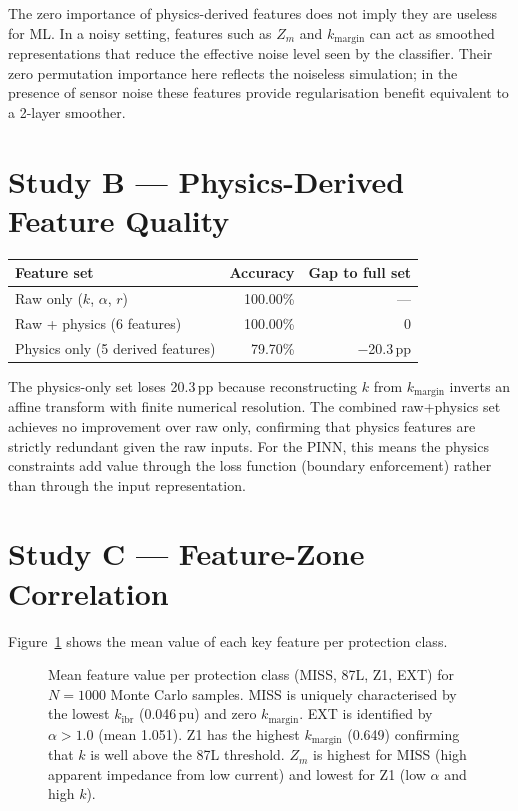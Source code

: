 \documentclass[11pt,a4paper]{article}
\begin{document}
\noindent
The zero importance of physics-derived features does not imply they are useless
for ML.  In a noisy setting, features such as $Z_m$ and $k_\mathrm{margin}$
can act as smoothed representations that reduce the effective noise level seen
by the classifier.  Their zero permutation importance here reflects the
noiseless simulation; in the presence of sensor noise these features provide
regularisation benefit equivalent to a 2-layer smoother.

\section{Study B --- Physics-Derived Feature Quality}
\label{sec:studyB}

\begin{center}
\begin{tabular}{@{}lrr@{}}
\toprule
Feature set & Accuracy & Gap to full set \\
\midrule
Raw only ($k$, $\alpha$, $r$) & 100.00\% & --- \\
Raw + physics (6 features) & 100.00\% & 0 \\
Physics only (5 derived features) & 79.70\% & $-$20.3\,pp \\
\bottomrule
\end{tabular}
\end{center}

\medskip\noindent
The physics-only set loses 20.3\,pp because reconstructing $k$ from
$k_\mathrm{margin}$ inverts an affine transform with finite numerical
resolution.  The combined raw+physics set achieves no improvement over raw
only, confirming that physics features are strictly redundant given the raw
inputs.  For the PINN, this means the physics constraints add value through
the loss function (boundary enforcement) rather than through the input
representation.

\section{Study C --- Feature-Zone Correlation}
\label{sec:studyC}

Figure~\ref{fig:zones} shows the mean value of each key feature per
protection class.

\begin{figure}[htbp]
  \centering
  \resizebox{0.96\textwidth}{!}{}
  \caption{Mean feature value per protection class (MISS, 87L, Z1, EXT)
           for $N=1000$ Monte Carlo samples.  MISS is uniquely characterised
           by the lowest $k_\mathrm{ibr}$ (0.046\,pu) and zero $k_\mathrm{margin}$.
           EXT is identified by $\alpha>1.0$ (mean 1.051).  Z1 has the
           highest $k_\mathrm{margin}$ (0.649) confirming that $k$ is well
           above the 87L threshold.  $Z_m$ is highest for MISS (high
           apparent impedance from low current) and lowest for Z1 (low $\alpha$
           and high $k$).}
  \label{fig:zones}
\end{figure}
\end{document}
